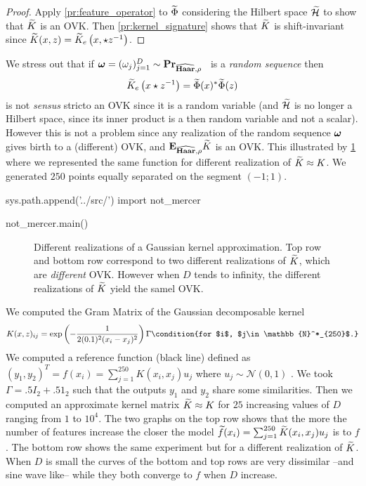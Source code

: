 \begin{proof} Apply \cref{pr:feature_operator} to $\widetilde{\Phi}$ considering the Hilbert space $\widetilde{\mathcal{H}}$ to show that $\widetilde{K}$ is an \acs{OVK}. Then \cref{pr:kernel_signature} shows that $\widetilde{K}$ is shift-invariant since $\widetilde{K}(x,z)=\widetilde{K}_e\left(x,\star z^{-1}\right)$.
\end{proof}
We stress out that if $\boldsymbol{\mathbf{\omega}}=(\omega_j)_{j=1}^D\sim {\mathbf{{Pr}}}_{\widehat{\mathbf{Haar}},\rho}$ \iid~is a \emph{random sequence} then
\begin{dmath*}
\tildeK{\omega}_e\left(x\groupop z^{-1}\right)=\tildePhi{\omega}(x)^{\adjoint}\tildePhi{\omega}(z)
\end{dmath*}
is not \emph{sensus} stricto an \acl{OVK} since it is a random variable (and $\widetilde{\mathcal{H}}$ is no longer a Hilbert space, since its inner product is a then random variable and not a scalar). However this is not a problem since any realization of the random sequence $\boldsymbol{\mathbf{\omega}}$ gives birth to a (different) \acl{OVK}, and ${\mathbf{{E}}}_{\widehat{\mathbf{Haar}},\rho}\widetilde{K}$ is an \acs{OVK}. This illustrated by \cref{fig:not_Mercer} where we represented the same function for different realization of $\widetilde{K}\approx K$. We generated $250$ points equally separated on the segment $(-1;1)$.

\begin{pycode}
sys.path.append('../src/')
import not_mercer

not_mercer.main()
\end{pycode}

\begin{figure}[htb]
\caption[Different realizations of a Gaussian kernel approximation]{Different realizations of a Gaussian kernel approximation. Top row and bottom row correspond to two different realizations of $\widetilde{K}$, which are \emph{different} \acl{OVK}. However when $D$ tends to infinity, the different realizations of $\widetilde{K}$ yield the samel \acs{OVK}.}
\label{fig:not_Mercer}
\end{figure}

We computed the Gram Matrix of the Gaussian decomposable kernel
\begin{dmath*}
K(x,z)_{ij}=\exp\left(-\frac{1}{2(0.1)^2(x_i - x_j)^2}\right)\Gamma \condition{for $i$, $j\in\mathbb{N}^*_{250}$.}
\end{dmath*}
We computed a reference function (black line) defined as $(y_1, y_2)^T = f(x_i)=\sum_{j=1}^{250}K(x_i,x_j)u_j$ where $u_j\sim\mathcal{N}(0,1)$ \iid. We took $\Gamma=.5 I_2 + .5 1_2$ such that the outputs $y_1$ and $y_2$ share some similarities. Then we computed an approximate kernel matrix $\widetilde{K}\approx K$ for $25$ increasing values of $D$ ranging from $1$ to $10^4$. The two graphs on the top row shows that the more the number of features increase the closer the model $\widetilde{f}(x_i)=\sum_{j=1}^{250}\widetilde{K}(x_i,x_j)u_j$ is to $f$. The bottom row shows the same experiment but for a different realization of $\widetilde{K}$. When $D$ is small the curves of the bottom and top rows are very dissimilar --and sine wave like-- while they both converge to $f$ when $D$ increase.
